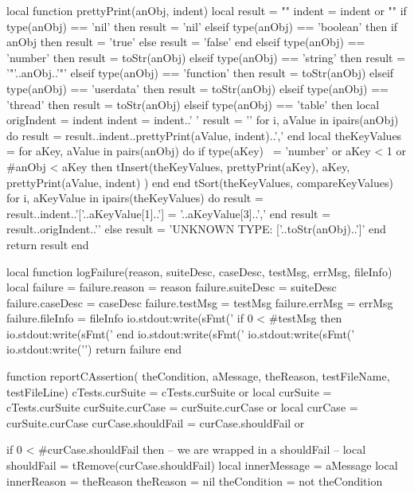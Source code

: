 local function prettyPrint(anObj, indent)
  local result = ""
  indent = indent or ""
  if type(anObj) == 'nil' then
    result = 'nil'
  elseif type(anObj) == 'boolean' then
    if anObj then result = 'true' else result = 'false' end
  elseif type(anObj) == 'number' then
    result = toStr(anObj)
  elseif type(anObj) == 'string' then
    result = '"'..anObj..'"'
  elseif type(anObj) == 'function' then
    result = toStr(anObj)
  elseif type(anObj) == 'userdata' then
    result = toStr(anObj)
  elseif type(anObj) == 'thread' then
    result = toStr(anObj)
  elseif type(anObj) == 'table' then
    local origIndent = indent
    indent = indent..'  '
    result = '{\n'
    for i, aValue in ipairs(anObj) do
      result = result..indent..prettyPrint(aValue, indent)..',\n'
    end
    local theKeyValues = { }
    for aKey, aValue in pairs(anObj) do
      if type(aKey) ~= 'number' or aKey < 1 or #anObj < aKey then
        tInsert(theKeyValues,
          { prettyPrint(aKey), aKey, prettyPrint(aValue, indent) })
      end
    end
    tSort(theKeyValues, compareKeyValues)
    for i, aKeyValue in ipairs(theKeyValues) do
      result = result..indent..'['..aKeyValue[1]..'] = '..aKeyValue[3]..',\n'
    end
    result = result..origIndent..'}'
  else
    result = 'UNKNOWN TYPE: ['..toStr(anObj)..']'
  end
  return result
end

local function logFailure(reason, suiteDesc, caseDesc,
                          testMsg, errMsg, fileInfo)
  local failure = {}
  failure.reason    = reason
  failure.suiteDesc = suiteDesc
  failure.caseDesc  = caseDesc
  failure.testMsg   = testMsg
  failure.errMsg    = errMsg
  failure.fileInfo  = fileInfo
  io.stdout:write(sFmt('    %
  if 0 < #testMsg then
    io.stdout:write(sFmt('    %
  end
  io.stdout:write(sFmt('    %
  io.stdout:write(sFmt('    %
  io.stdout:write('\n\n')
  return failure
end

function reportCAssertion(
  theCondition, aMessage, theReason,
  testFileName, testFileLine)
  cTests.curSuite    = cTests.curSuite or { }
  local curSuite     = cTests.curSuite
  curSuite.curCase   = curSuite.curCase or { }
  local curCase      = curSuite.curCase
  curCase.shouldFail = curCase.shouldFail or { }
  
  if 0 < #curCase.shouldFail then
    -- we are wrapped in a shouldFail
    --
    local shouldFail   = tRemove(curCase.shouldFail)
    local innerMessage = aMessage
    local innerReason  = theReason
    theReason          = nil
    theCondition       = not theCondition
  

